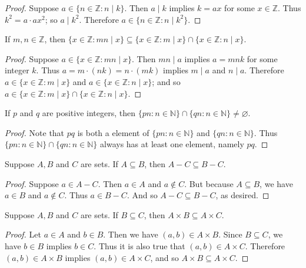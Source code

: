 \documentclass{exam}
\begin{document}
\begin{proof}
    Suppose $a\in\{n\in\mathbb Z: n\mid k\}$. Then $a\mid k$ implies $k = ax$ for some $x\in\mathbb Z$. Thus $k^2 = a\cdot ax^2$; so $a\mid k^2$. Therefore $a\in\{n\in\mathbb Z: n\mid k^2\}$.
\end{proof}

\begin{proposition}{8.4}
    If $m,n\in\mathbb Z$, then $\{x\in\mathbb Z:mn\mid x\}\subseteq \{x\in\mathbb Z:m\mid x\}\cap\{x\in\mathbb Z: n\mid x\}$.
\end{proposition}

\begin{proof}
    Suppose $a\in\{x\in\mathbb Z:mn\mid x\}$. Then $mn\mid a$ implies $a=mnk$ for some integer $k$. Thus $a = m\cdot(nk) = n\cdot(mk)$ implies $m \mid a$ and $n\mid a$. Therefore $a\in\{x\in\mathbb Z:m\mid x\}$ and $a\in\{x\in\mathbb Z: n\mid x\}$; and so $a\in\{x\in\mathbb Z:m\mid x\}\cap\{x\in\mathbb Z: n\mid x\}$.
\end{proof}

\begin{proposition}{8.5}
    If $p$ and $q$ are positive integers, then $\{pn:n\in\mathbb N\}\cap\{qn:n\in\mathbb N\}\neq\varnothing$.
\end{proposition}

\begin{proof}
    Note that $pq$ is both a element of $\{pn:n\in\mathbb N\}$ and $\{qn:n\in\mathbb N\}$. Thus $\{pn:n\in\mathbb N\}\cap\{qn:n\in\mathbb N\}$ always has at least one element, namely $pq$.
\end{proof}

\begin{proposition}{8.6}
    Suppose $A,B$ and $C$ are sets. If $A\subseteq B$, then $A-C\subseteq B-C$.
\end{proposition}

\begin{proof}
    Suppose $a\in A - C$. Then $a\in A$ and $a\notin C$. But because $A\subseteq B$, we have $a\in B$ and $a\notin C$. Thus $a\in B - C$. And so $A - C \subseteq B - C$, as desired.
\end{proof}

\begin{proposition}{8.7}
    Suppose $A, B$ and $C$ are sets. If $B\subseteq C$, then $A\times B\subseteq A\times C$.
\end{proposition}

\begin{proof}
    Let $a\in A$ and $b\in B$. Then we have $(a, b)\in A\times B$. Since $B\subseteq C$, we have $b\in B$ implies $b\in C$. Thus it is also true that $(a, b)\in A\times C$. Therefore $(a, b) \in A\times B$ implies $(a, b)\in A \times C$, and so $A\times B \subseteq A\times C$.
\end{proof}
\end{document}
